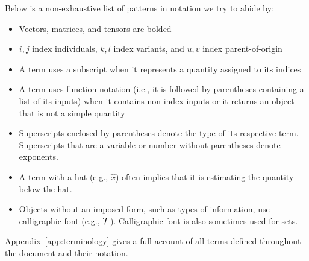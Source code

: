 \documentclass[12pt]{article}
\numberwithin{equation}{section}
\begin{document}
Below is a non-exhaustive list of patterns in notation we try to abide by:
\begin{itemize}
\item Vectors, matrices, and tensors are bolded
\item $i,j$ index individuals, $k,l$ index variants, and $u,v$ index parent-of-origin
\item A term uses a subscript when it represents a quantity assigned to its indices
\item A term uses function notation (i.e., it is followed by parentheses containing a list of its inputs) when it contains non-index inputs or it returns an object that is not a simple quantity
\item Superscripts enclosed by parentheses denote the type of its respective term. Superscripts that are a variable or number without parentheses denote exponents.
\item A term with a hat (e.g., $\widehat{x}$) often implies that it is estimating the quantity below the hat.
\item Objects without an imposed form, such as types of information, use calligraphic font (e.g., $\mathcal{T}$). Calligraphic font is also sometimes used for sets.
\end{itemize}

Appendix~\ref{app:terminology} gives a full account of all terms defined throughout the document and their notation.
\end{document}
